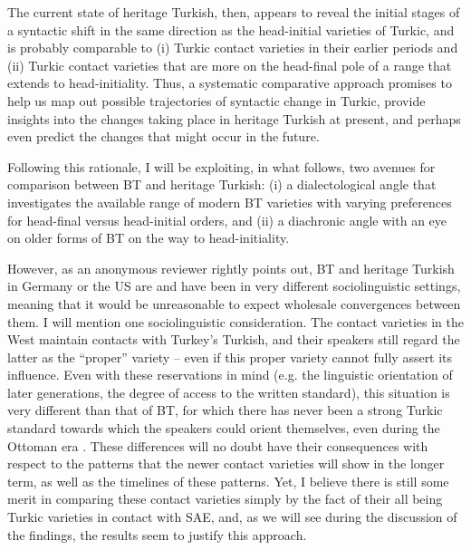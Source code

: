 \documentclass[output=paper,colorlinks,citecolor=brown]{langscibook}
\begin{document}
The current state of heritage Turkish, then, appears to reveal the initial stages of a syntactic shift in the same direction as the head-initial varieties of Turkic, and is probably comparable to (i) Turkic contact varieties in their earlier periods and (ii) Turkic contact varieties that are more on the head-final pole of a range that extends to head-initiality. Thus, a systematic comparative approach promises to help us map out possible trajectories of syntactic change in Turkic, provide insights into the changes taking place in heritage Turkish at present, and perhaps even predict the changes that might occur in the future. 

Following this rationale, I will be exploiting, in what follows, two avenues for comparison between BT and heritage Turkish: (i) a dialectological angle that investigates the available range of modern BT varieties with varying preferences for head-final versus head-initial orders, and (ii) a diachronic angle with an eye on older forms of BT on the way to head-initiality.

However, as an anonymous reviewer rightly points out, BT and heritage Turkish in Germany or the US are and have been in very different sociolinguistic settings, meaning that it would be unreasonable to expect wholesale convergences between them. I will mention one sociolinguistic consideration. The contact varieties in the West maintain contacts with Turkey's Turkish, and their speakers still regard the latter as the ``proper'' variety -- even if this proper variety cannot fully assert its influence. Even with these reservations in mind (e.g. the linguistic orientation of later generations, the degree of access to the written standard), this situation is very different than that of BT, for which there has never been a strong Turkic standard towards which the speakers could orient themselves, even during the Ottoman era \citep{Johanson.1989}. These differences will no doubt have their consequences with respect to the patterns that the newer contact varieties will show in the longer term, as well as the timelines of these patterns. Yet, I believe there is still some merit in comparing these contact varieties simply by the fact of their all being Turkic varieties in contact with SAE, and, as we will see during the discussion of the findings, the results seem to justify this approach.
\end{document}
